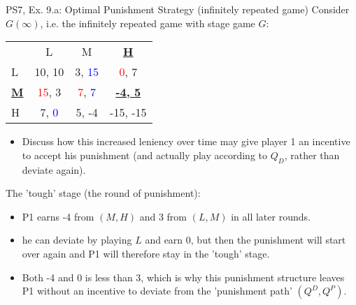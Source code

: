 \begin{frame}{PS7, Ex. 9.a: Optimal Punishment Strategy (infinitely repeated game)}
    Consider $G(\infty)$, i.e. the infinitely repeated game with stage game $G$: \vspace{-6pt}
    \begin{table}
      \begin{tabular}{l|c|c|c|}
        \multicolumn{1}{c}{} & \multicolumn{1}{c}{L} & \multicolumn{1}{c}{M} & \multicolumn{1}{c}{\textbf{\underline{H}}} \\\cline{2-4}
        L & 10, 10 & 3, \textcolor{blue}{15} & \textcolor{red}{0}, 7 \\\cline{2-4}
        \textbf{\underline{M}} & \textcolor{red}{15}, 3 & \textcolor{red}{7}, \textcolor{blue}{7} & \textbf{\underline{-4, 5}} \\\cline{2-4}
        H & 7, \textcolor{blue}{0} & 5, -4 & -15, -15 \\\cline{2-4}
      \end{tabular}
    \end{table}
    \vspace{-4pt}
    \begin{itemize}
      \item[(a)] Discuss how this increased leniency over time may give player 1 an incentive to accept his punishment (and actually play according to $Q_D$, rather than deviate again).
    \end{itemize}
    \vspace{-8pt}
  \begin{multicols}{2}
    The 'tough' stage (the  round of punishment):\vspace{-4pt}
    \begin{itemize}
      \item P1 earns -4 from $(M, H)$ and 3 from $(L, M)$ in all later rounds.
      \item he can deviate by playing $L$ and earn 0, but then the punishment will start over again and P1 will therefore stay in the 'tough' stage.
      \item Both -4 and 0 is less than 3, which is why this punishment structure leaves P1 without an incentive to deviate from the 'punishment path' $(Q^D,Q^P)$.
    \end{itemize}
    \vfill\null\columnbreak
    \vfill\null
  \end{multicols}
\end{frame}
